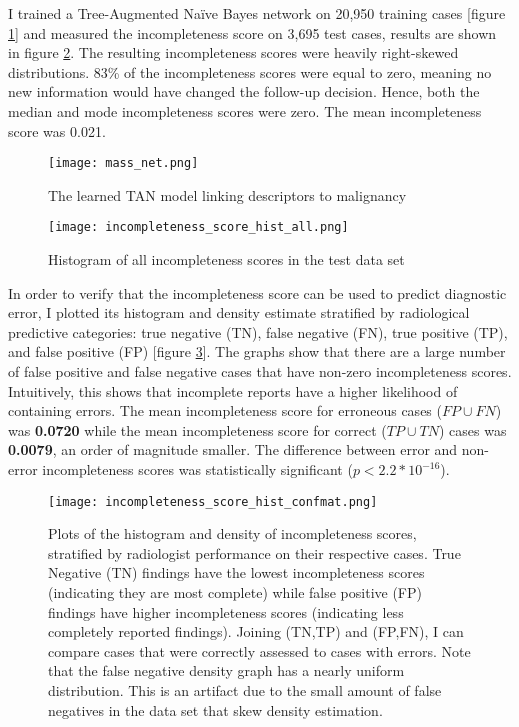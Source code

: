 I trained a Tree-Augmented Na\"{i}ve Bayes network on 20,950 training cases [figure \ref{fig:mass_net}] and measured the incompleteness score on 3,695 test cases, results are shown in figure \ref{fig:incompleteness_score_hist_all}. The resulting incompleteness scores were heavily right-skewed distributions. 83\% of the incompleteness scores were equal to zero, meaning no new information would have changed the follow-up decision. Hence, both the median and mode incompleteness scores were zero. The mean incompleteness score was 0.021.

\begin{figure}[h]
	\centering
	\texttt{[image: mass\_net.png]}
	\caption{The learned TAN model linking descriptors to malignancy}
	\label{fig:mass_net}
\end{figure}


\clearpage
\begin{figure}[h]
\centering
\texttt{[image: incompleteness\_score\_hist\_all.png]}
\caption{Histogram of all incompleteness scores in the test data set}
\label{fig:incompleteness_score_hist_all}
\end{figure}


\clearpage
In order to verify that the incompleteness score can be used to predict diagnostic error, I plotted its histogram and density estimate stratified by radiological predictive categories: true negative (TN), false negative (FN), true positive (TP), and false positive (FP) [figure \ref{fig:incompleteness_score_hist_confmat}]. The graphs show that there are a large number of false positive and false negative cases that have non-zero incompleteness scores. Intuitively, this shows that incomplete reports have a higher likelihood of containing errors. The mean incompleteness score for erroneous cases ($FP \cup FN$) was \textbf{0.0720} while the mean incompleteness score for correct ($TP \cup TN$) cases was \textbf{0.0079}, an order of magnitude smaller. The difference between error and non-error incompleteness scores was statistically significant ($p < 2.2*10^{-16}$).

\begin{figure}[h]
\centering
\texttt{[image: incompleteness\_score\_hist\_confmat.png]}
\caption[Incompleteness scores stratified by confusion matrix]{Plots of the histogram and density of incompleteness scores, stratified by radiologist performance on their respective cases. True Negative (TN) findings have the lowest incompleteness scores (indicating they are most complete) while false positive (FP) findings have higher incompleteness scores (indicating less completely reported findings). Joining (TN,TP) and (FP,FN), I can compare cases that were correctly assessed to cases with errors. Note that the false negative density graph has a nearly uniform distribution. This is an artifact due to the small amount of false negatives in the data set that skew density estimation.}
\label{fig:incompleteness_score_hist_confmat}
\end{figure}


